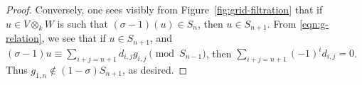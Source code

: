 \documentclass[reqno]{amsart}
\numberwithin{equation}{subsection}
\newcommand{\rT}{\ensuremath{\mathrm{T}}\xspace}
\theoremstyle{remark}
\numberwithin{equation}{subsection}
\numberwithin{figure}{subsection}
\begin{document}
\begin{proof}
Conversely, one sees visibly from Figure~\ref{fig:grid-filtration} that if $u \in V \otimes_k W$ is such that $(\sigma-1)(u) \in S_n$, then $u \in S_{n+1}$. %
From \eqref{eqn:g-relation}, we see that if $u \in S_{n+1}$, and $(\sigma-1)u \equiv \sum_{i+j = n+1} d_{i,j}g_{i,j} \pmod{S_{n-1}}$, then $\sum_{i+j=n+1} (-1)^i d_{i,j} = 0$. Thus $g_{1,n} \not\in (1-\sigma)S_{n+1}$, as desired.


\end{proof}
\end{document}
